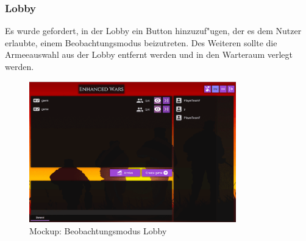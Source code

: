\documentclass[12pt, titlepage]{scrartcl}
\begin{document}
	        \subsubsection{Lobby}
	           Es wurde gefordert, in der Lobby ein Button hinzuzuf"ugen, der es dem Nutzer erlaubte, einem Beobachtungsmodus beizutreten. Des Weiteren sollte die Armeeauswahl aus der Lobby entfernt werden und in den Warteraum verlegt werden. \\
	            \begin{figure}[H] 
    				\centering
    				\includegraphics[width=0.8\textwidth]{images/mockups/LobbyWatchMode.png}
    				\caption{Mockup: Beobachtungsmodus Lobby}
    				\label{Watch_Mode}
			    \end{figure}
\end{document}
